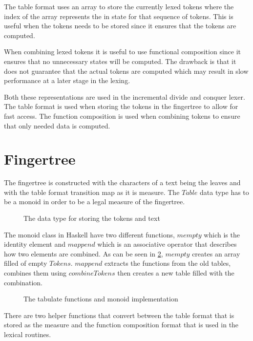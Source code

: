 The table format uses an array to store the currently lexed tokens where the
index of the array represents the in state for that sequence of tokens. This is
useful when the tokens needs to be stored since it ensures that the tokens are
computed.

When combining lexed tokens it is useful to use functional composition since it
ensures that no unnecessary states will be computed. The drawback is that it
does not guarantee that the actual tokens are computed which may result in slow
performance at a later stage in the lexing.

Both these representations are used in the incremental divide and conquer lexer.
The table format is used when storing the tokens in the fingertree to allow for
fast access. The function composition is used when combining tokens to ensure
that only needed data is computed.

\section{Fingertree}
The fingertree is constructed with the characters of a text being the leaves and
with the table format transition map as it is measure. The $Table$ data type has
to be a monoid in order to be a legal measure of the fingertree.

\begin{figure}[h!]
  
  \caption{The data type for storing the tokens and text \label{fig:fingertreedt}}
\end{figure}

The monoid class in Haskell have two different functions, $mempty$ which is the
identity element and $mappend$ which is an associative operator that describes
how two elements are combined. As can be seen in \cref{fig:tablemonoid},
$mempty$ creates an array filled of empty $Tokens$. $mappend$ extracts the
functions from the old tables, combines them using $combineTokens$ then creates
a new table filled with the combination.

\begin{figure}[h!]
  
  \caption{The tabulate functions and monoid implementation \label{fig:tablemonoid}}
\end{figure}

There are two helper functions that convert between the table format that is
stored as the measure and the function composition format that is used in the
lexical routines.

